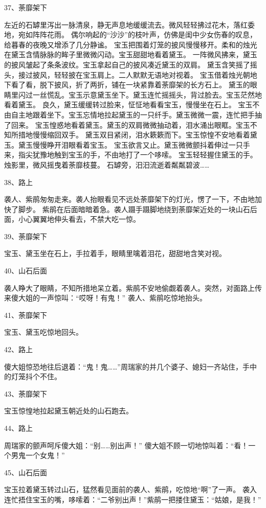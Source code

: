 37、荼靡架下\par
左近的石罅里泻出一脉清泉，静无声息地缓缓流去。微风轻轻拂过花木，落红委地，宛如阵阵花雨。
偶尔响起的“沙沙”的枝叶声，仿佛是闺中少女伤春的叹息，给暮春的夜晚又增添了几分静谧。
宝玉把围着灯笼的披风慢慢移开。柔和的烛光在黛玉含情脉脉的眸子里微微闪动。宝玉甜甜地看着黛玉。
一阵微风拂来，黛玉的披风皱起了条条波纹。宝玉拿起自己的披风凑近黛玉的双肩。
黛玉含笑摇了摇头，接过披风，轻轻披在宝玉肩上。二人默默无语地对视着。
宝玉借着烛光朝地下看了看，脱下披风，折了两折，铺在一块紧靠着荼靡架的长方石上。
黛玉的眼睛里闪过一丝慌乱。宝玉示意黛玉坐下。黛玉连忙摇摇头，背过脸去。宝玉茫然地看着黛玉。
良久，黛玉缓缓转过脸来，怔怔地看看宝玉，慢慢坐在石上。
宝玉不由自主地跟着坐下。宝玉忘情地拉起黛玉的一只纤手。黛玉微微一震，连忙把手抽了回来。
宝玉惶惑地看着黛玉。黛玉的双肩微微抽动着，泪水涌出眼眶。宝玉不知所措地慢慢缩回双手。
黛玉双目紧闭，泪水簌簌而下。宝玉惊惶不安地看着黛玉。黛玉慢慢睁开泪眼看着宝玉。
宝玉欲言又止。黛玉微微颤抖着伸过一只手来，指尖犹豫地触到宝玉的手，不由地打了一个哆嗦。
宝玉轻轻握住黛玉的手。烛影里，微风摇曳着荼靡枝蔓。
石罅旁，汨汨流逝着粼粼碧波……

38、路上\par
袭人、紫鹃匆匆走来。袭人抬眼看见不远处荼靡架下的灯光，愣了一下，不由地加快了脚步。
紫鹃在后面暗暗着急。袭人蹑手蹑脚地绕到荼靡架近处的一块山石后面，小心翼翼地伸头看去，不禁大吃一惊。

39、荼靡架下\par
宝玉、黛玉坐在石上，手拉着手，眼睛里噙着泪花，甜甜地含笑对视。

40、山石后面\par
袭人睁大了眼睛，不知所措地呆立着。紫鹃不安地偷觑着袭人。突然，对面路上传来傻大姐的一声惊叫：“哎呀！有鬼！”
袭人、紫鹃吃惊地抬头。

41、荼靡架下\par
宝玉、黛玉吃惊地回头。

42、路上\par
傻大姐惊恐地往后退着：“鬼！鬼……”周瑞家的并几个婆子、媳妇一齐站住，手中的灯笼抖个不住。

43、荼靡架下\par
宝玉惊惶地拉起黛玉朝近处的山石跑去。

44、路上\par
周瑞家的颤声呵斥傻大姐：“别……别出声！”
傻大姐不顾一切地惊叫着：“看！一个男鬼一个女鬼！”

45、山石后面\par
宝玉拉着黛玉转过山石，猛然看见面前的袭人、紫鹃，吃惊地“啊”了一声。
袭入连忙捂住宝玉的嘴，哆嗦着：“二爷别出声！”紫鹃一把搂住黛玉：“姑娘，是我！”


